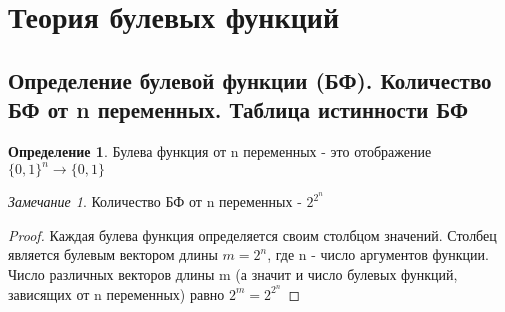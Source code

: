 \documentclass[a4paper]{article}
\theoremstyle{definition}
\newtheorem*{definition}{Определение}
\theoremstyle{remark}
\newtheorem*{remark}{Замечание}
\begin{document}
    \tableofcontents
    \setcounter{page}{1}
    \section{Теория булевых функций}
    \subsection{Определение булевой функции (БФ). Количество БФ от n переменных. Таблица истинности БФ}
    \begin{definition}
        Булева функция от n переменных - это отображение $\{0,1\}^n \rightarrow \{0, 1\}$
    \end{definition}

    \begin{remark}
        Количество БФ от n переменных - $2^{2^n}$
    \end{remark}
    \begin{proof}
        Каждая булева функция определяется своим столбцом значений.
        Столбец является булевым вектором длины $m=2^n$, где n - число аргументов функции.
        Число различных векторов длины m (а значит и число булевых функций, зависящих от n переменных) равно $2^m=2^{2^n}$
    \end{proof}
\end{document}
